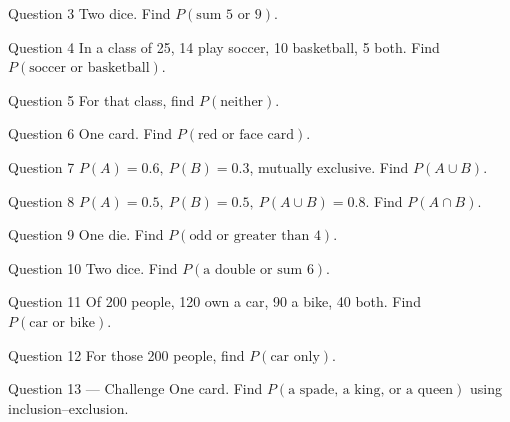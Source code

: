 \documentclass[11pt]{article}
\begin{document}
\begin{qbox}{Question 3}
Two dice. Find $P(\text{sum }5\text{ or }9)$.\workspace{2.4cm}
\end{qbox}

\begin{qbox}{Question 4}
In a class of 25, 14 play soccer, 10 basketball, 5 both. Find $P(\text{soccer or basketball})$.\workspace{2.4cm}
\end{qbox}

\begin{qbox}{Question 5}
For that class, find $P(\text{neither})$.\workspace{2.4cm}
\end{qbox}

\begin{qbox}{Question 6}
One card. Find $P(\text{red or face card})$.\workspace{2.4cm}
\end{qbox}

\begin{qbox}{Question 7}
$P(A)=0.6,\ P(B)=0.3$, mutually exclusive. Find $P(A\cup B)$.\workspace{2.4cm}
\end{qbox}

\begin{qbox}{Question 8}
$P(A)=0.5,\ P(B)=0.5,\ P(A\cup B)=0.8$. Find $P(A\cap B)$.\workspace{2.4cm}
\end{qbox}

\begin{qbox}{Question 9}
One die. Find $P(\text{odd or greater than }4)$.\workspace{2.4cm}
\end{qbox}

\begin{qbox}{Question 10}
Two dice. Find $P(\text{a double or sum }6)$.\workspace{2.4cm}
\end{qbox}

\begin{qbox}{Question 11}
Of 200 people, 120 own a car, 90 a bike, 40 both. Find $P(\text{car or bike})$.\workspace{2.4cm}
\end{qbox}

\begin{qbox}{Question 12}
For those 200 people, find $P(\text{car only})$.\workspace{2.4cm}
\end{qbox}

\begin{qbox}{Question 13 --- Challenge}
One card. Find $P(\text{a spade, a king, or a queen})$ using inclusion--exclusion.\workspace{3cm}
\end{qbox}

\clearpage
{}
\end{document}
